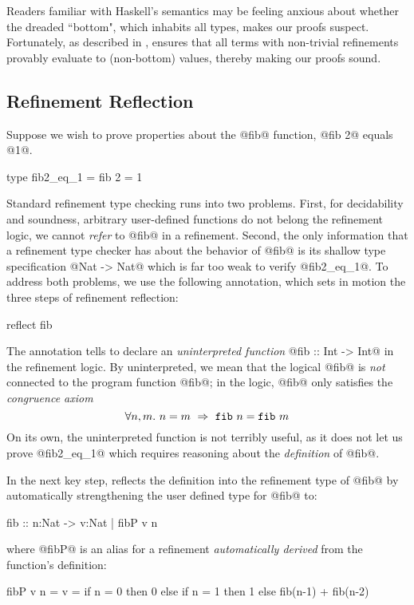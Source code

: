  Readers familiar with Haskell's
semantics may be feeling anxious about whether the
dreaded ``bottom", which inhabits all types, makes our
proofs suspect.
%
Fortunately, as described in \cite{Vazou14}, \toolname
ensures that all terms with non-trivial refinements
provably evaluate to (non-bottom) values, thereby making
our proofs sound.

\subsection{Refinement Reflection}

Suppose we wish to prove properties about the @fib@
function, \eg @fib 2@ equals @1@.
%
\begin{code}
  type fib2_eq_1 = { fib 2 = 1 }
\end{code}
%
Standard refinement type checking runs into two problems.
%
First, for decidability and soundness, arbitrary user-defined
functions do not belong the refinement logic, \ie we cannot
\emph{refer} to @fib@ in a refinement.
%
Second, the only information that a refinement type checker
has about the behavior of @fib@ is its shallow type
specification @Nat -> Nat@ which is far too weak to verify
@fib2_eq_1@.
%
To address both problems, we use the following annotation,
which sets in motion the three steps of refinement reflection:
%
\begin{code}
  reflect fib
\end{code}

%
The annotation tells \toolname to declare an
\emph{uninterpreted function} @fib :: Int -> Int@
in the refinement logic.
%
By uninterpreted, we mean that the logical @fib@
is \emph{not} connected to the program function
@fib@; in the logic, @fib@
only satisfies the \emph{congruence axiom}
%
$$\forall n, m.\ n = m\ \Rightarrow\ \fib{n} = \fib{m}$$
%
On its own, the uninterpreted function is not
terribly useful, as it does not let us prove
%
@fib2_eq_1@ which requires reasoning about the
\emph{definition} of @fib@.

%
In the next key step, \toolname reflects the
definition into the refinement type of @fib@
by automatically strengthening the user defined
type for @fib@ to:
%
\begin{code}
  fib :: n:Nat -> { v:Nat | fibP v n }
\end{code}
%
where @fibP@ is an alias for a refinement
\emph{automatically derived} from the
function's definition:
%
\begin{mcode}
  fibP v n = v = if n = 0 then 0 else
                 if n = 1 then 1 else
                 fib(n-1) + fib(n-2)
\end{mcode}


